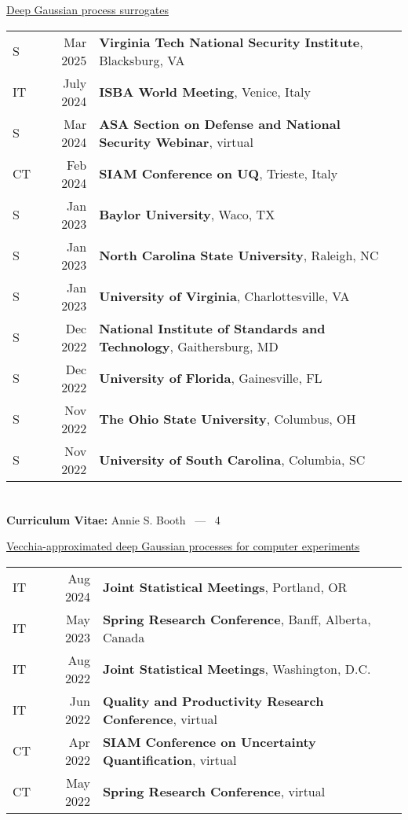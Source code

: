 \documentclass[margin,line,11pt]{res}
\begin{document}
\begin{resume}
\underline{Deep Gaussian process surrogates}\\
\begin{tabular}{lrl}
S\quad\quad & Mar 2025 & {\bf Virginia Tech National Security Institute}, Blacksburg, VA \\
IT\quad\quad & July 2024 & {\bf ISBA World Meeting}, Venice, Italy \\
S\quad\quad & Mar 2024 & {\bf ASA Section on Defense and National Security Webinar}, virtual \\
CT\quad\quad & Feb 2024 & {\bf SIAM Conference on UQ}, Trieste, Italy \\
S\quad\quad & Jan 2023 & {\bf Baylor University}, Waco, TX \\
S\quad\quad & Jan 2023 & {\bf North Carolina State University}, Raleigh, NC \\
S\quad\quad & Jan 2023 & {\bf University of Virginia}, Charlottesville, VA \\
S\quad\quad & Dec 2022 & {\bf National Institute of Standards and Technology}, Gaithersburg, MD \\
S\quad\quad & Dec 2022 & {\bf University of Florida}, Gainesville, FL \\
S\quad\quad & Nov 2022 & {\bf The Ohio State University}, Columbus, OH \\
S\quad\quad & Nov 2022 & {\bf University of South Carolina}, Columbia, SC \\
\end{tabular}

\pagebreak
\section{}
\hfill {\bf Curriculum Vitae:} Annie S. Booth \  --- \  4
\medskip

\underline{Vecchia-approximated deep Gaussian processes for computer experiments}\\
\begin{tabular}{lrl}
IT & Aug 2024 & {\bf Joint Statistical Meetings}, Portland, OR \\
IT & May 2023 & {\bf Spring Research Conference}, Banff, Alberta, Canada \\
IT & Aug 2022 & {\bf Joint Statistical Meetings}, Washington, D.C. \\
IT & Jun 2022 & {\bf Quality and Productivity Research Conference}, virtual \\
CT & Apr 2022 & {\bf SIAM Conference on Uncertainty Quantification}, virtual \\
CT & May 2022 & {\bf Spring Research Conference}, virtual \\
\end{tabular}


\end{resume}
\end{document}
